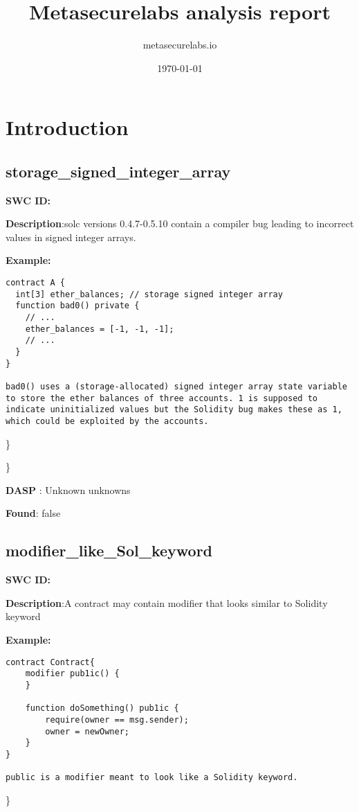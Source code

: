 \documentclass{article}
\title{Metasecurelabs analysis report}
\author{metasecurelabs.io }
\date{\today}
\begin{document}
 

\maketitle 

\section{Introduction} 
\subsection{storage\_signed\_integer\_array} 
\textbf{SWC \textunderscore ID:} 

\textbf{Description}:solc versions 0.4.7-0.5.10 contain a compiler bug leading to incorrect values in signed integer arrays.


\textbf{Example:} 
\begin{verbatim}
contract A {
  int[3] ether_balances; // storage signed integer array
  function bad0() private {
    // ...
    ether_balances = [-1, -1, -1];
    // ...
  }
}

bad0() uses a (storage-allocated) signed integer array state variable to store the ether balances of three accounts. 1 is supposed to indicate uninitialized values but the Solidity bug makes these as 1, which could be exploited by the accounts.

\end{verbatim}\} 

\} 

\textbf{DASP} : Unknown unknowns

\textbf{Found}: false

\subsection{modifier\_like\_Sol\_keyword} 
\textbf{SWC \textunderscore ID:} 

\textbf{Description}:A contract may contain modifier that looks similar to Solidity keyword


\textbf{Example:} 
\begin{verbatim}
contract Contract{
    modifier pub1ic() {
    }

    function doSomething() pub1ic {
        require(owner == msg.sender);
        owner = newOwner;
    }
}

public is a modifier meant to look like a Solidity keyword.

\end{verbatim}\} 
\end{document}
